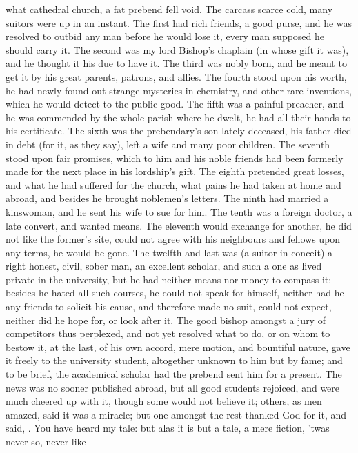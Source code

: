 {what cathedral church, a fat prebend fell void. The carcass scarce
cold, many suitors were up in an instant. The first had rich friends, a
good purse, and he was resolved to outbid any man before he would lose
it, every man supposed he should carry it. The second was my lord
Bishop's chaplain (in whose gift it was), and he thought it his due to
have it. The third was nobly born, and he meant to get it by his great
parents, patrons, and allies. The fourth stood upon his worth, he had
newly found out strange mysteries in chemistry, and other rare
inventions, which he would detect to the public good. The fifth was a
painful preacher, and he was commended by the whole parish where he
dwelt, he had all their hands to his certificate. The sixth was the
prebendary's son lately deceased, his father died in debt (for it, as
they say), left a wife and many poor children. The seventh stood upon
fair promises, which to him and his noble friends had been formerly
made for the next place in his lordship's gift. The eighth pretended
great losses, and what he had suffered for the church, what pains he
had taken at home and abroad, and besides he brought noblemen's
letters. The ninth had married a kinswoman, and he sent his wife to sue
for him. The tenth was a foreign doctor, a late convert, and wanted
means. The eleventh would exchange for another, he did not like the
former's site, could not agree with his neighbours and fellows upon any
terms, he would be gone. The twelfth and last was (a suitor in conceit)
a right honest, civil, sober man, an excellent scholar, and such a one
as lived private in the university, but he had neither means nor money
to compass it; besides he hated all such courses, he could not speak
for himself, neither had he any friends to solicit his cause, and
therefore made no suit, could not expect, neither did he hope for, or
look after it. The good bishop amongst a jury of competitors thus
perplexed, and not yet resolved what to do, or on whom to bestow it, at
the last, of his own accord, mere motion, and bountiful nature, gave it
freely to the university student, altogether unknown to him but by
fame; and to be brief, the academical scholar had the prebend sent him
for a present. The news was no sooner published abroad, but all good
students rejoiced, and were much cheered up with it, though some would
not believe it; others, as men amazed, said it was a miracle; but one
amongst the rest thanked God for it, and said, . You have heard my tale:
but alas it is but a tale, a mere fiction, 'twas never so, never like
}
